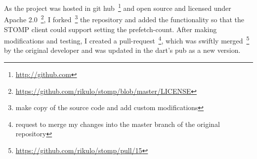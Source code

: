   As the project was hosted in git hub~\footnote{\url{http://github.com}} and open source and licensed under Apache 2.0~\footnote{\url{https://github.com/rikulo/stomp/blob/master/LICENSE}}, I forked~\footnote{make copy of the source code and add custom modifications} the repository and added the functionality so that the STOMP client could support setting the prefetch-count. After making modifications and testing, I created a pull-request~\footnote{request to merge my changes into the master branch of the original repository}, which was swiftly merged~\footnote{\url{https://github.com/rikulo/stomp/pull/15}} by the original developer and was updated in the dart's pub as a new version.
